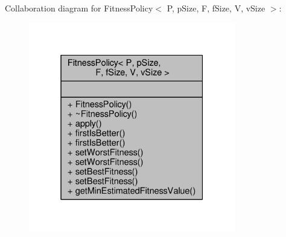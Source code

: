 Collaboration diagram for Fitness\+Policy$<$ P, p\+Size, F, f\+Size, V, v\+Size $>$\+:
\nopagebreak
\begin{figure}[H]
\begin{center}
\leavevmode
\includegraphics[width=256pt]{classFitnessPolicy__coll__graph}
\end{center}
\end{figure}
